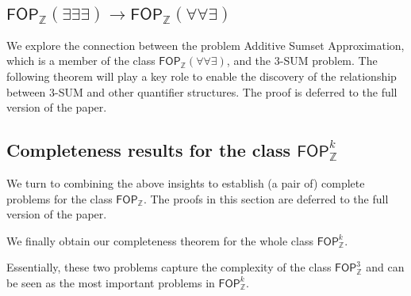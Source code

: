  





\subsection{$\mathsf{FOP}_{\mathbb{Z}}(\exists \exists \exists) \to \mathsf{FOP}_{\mathbb{Z}}(\forall \forall \exists)$}
We explore the connection between the problem Additive Sumset Approximation, which is a member of the class 
$\mathsf{FOP}_{\mathbb{Z}}(\forall \forall \exists)$, and the $3$-SUM problem.
The following theorem will play a key role to enable the discovery of the relationship between $3$-SUM and other quantifier structures.
\sumsetapproxchar*
The proof is deferred to the full version of the paper.
\subsection{Completeness results for the class $\mathsf{FOP}_{\mathbb{Z}}^k$}
We turn to combining the above insights to establish (a pair of) complete problems for the class $\mathsf{FOP}_{\mathbb{Z}}$. The proofs in this section are deferred to the full version of the paper.


\verifhard*

\hunthard*
We finally obtain  our completeness theorem for the whole class $\mathsf{FOP}_{\mathbb{Z}}^k$.
\completenessclass*

Essentially, these two problems capture the complexity of the class $\mathsf{FOP}_{\mathbb{Z}}^3$ and can be seen as the most important problems in $\mathsf{FOP}_{\mathbb{Z}}^{k}$. 


